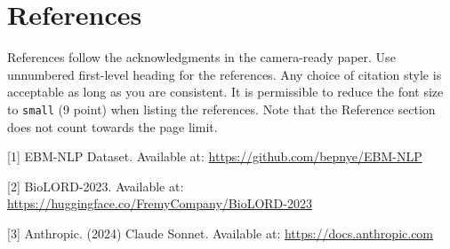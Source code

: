 \documentclass{article}
\begin{document}
\section*{References}


References follow the acknowledgments in the camera-ready paper. Use unnumbered first-level heading for
the references. Any choice of citation style is acceptable as long as you are
consistent. It is permissible to reduce the font size to \verb+small+ (9 point)
when listing the references.
Note that the Reference section does not count towards the page limit.
\medskip


{
\small


[1] EBM-NLP Dataset. Available at: \url{https://github.com/bepnye/EBM-NLP}


[2] BioLORD-2023. Available at: \url{https://huggingface.co/FremyCompany/BioLORD-2023}


[3] Anthropic. (2024) Claude Sonnet. Available at: \url{https://docs.anthropic.com}
}







%
\end{document}
